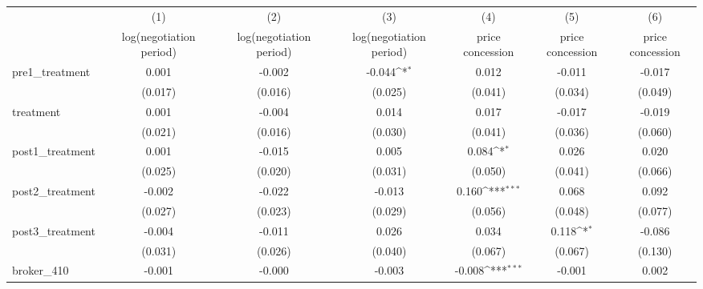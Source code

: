 {
\def\sym#1{\ifmmode^{#1}\else\(^{#1}\)\fi}
\begin{tabular}{l*{6}{c}}
\toprule
            &\multicolumn{1}{c}{(1)}&\multicolumn{1}{c}{(2)}&\multicolumn{1}{c}{(3)}&\multicolumn{1}{c}{(4)}&\multicolumn{1}{c}{(5)}&\multicolumn{1}{c}{(6)}\\
            &\multicolumn{1}{c}{log(negotiation period)}&\multicolumn{1}{c}{log(negotiation period)}&\multicolumn{1}{c}{log(negotiation period)}&\multicolumn{1}{c}{price concession}&\multicolumn{1}{c}{price concession}&\multicolumn{1}{c}{price concession}\\
\midrule
pre1\_treatment&       0.001         &      -0.002         &      -0.044\sym{*}  &       0.012         &      -0.011         &      -0.017         \\
            &     (0.017)         &     (0.016)         &     (0.025)         &     (0.041)         &     (0.034)         &     (0.049)         \\
\addlinespace
treatment   &       0.001         &      -0.004         &       0.014         &       0.017         &      -0.017         &      -0.019         \\
            &     (0.021)         &     (0.016)         &     (0.030)         &     (0.041)         &     (0.036)         &     (0.060)         \\
\addlinespace
post1\_treatment&       0.001         &      -0.015         &       0.005         &       0.084\sym{*}  &       0.026         &       0.020         \\
            &     (0.025)         &     (0.020)         &     (0.031)         &     (0.050)         &     (0.041)         &     (0.066)         \\
\addlinespace
post2\_treatment&      -0.002         &      -0.022         &      -0.013         &       0.160\sym{***}&       0.068         &       0.092         \\
            &     (0.027)         &     (0.023)         &     (0.029)         &     (0.056)         &     (0.048)         &     (0.077)         \\
\addlinespace
post3\_treatment&      -0.004         &      -0.011         &       0.026         &       0.034         &       0.118\sym{*}  &      -0.086         \\
            &     (0.031)         &     (0.026)         &     (0.040)         &     (0.067)         &     (0.067)         &     (0.130)         \\
\addlinespace
broker\_410  &      -0.001         &      -0.000         &      -0.003         &      -0.008\sym{***}&      -0.001         &       0.002         \\

\end{tabular}}

